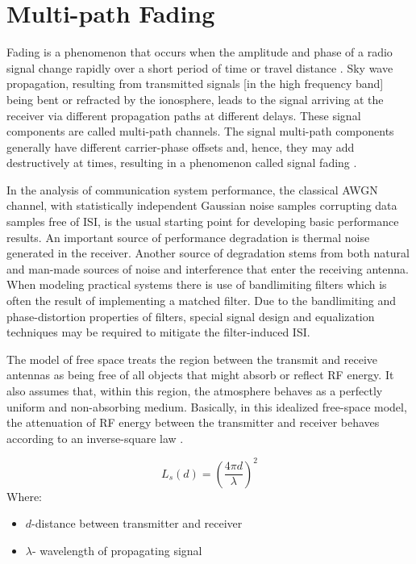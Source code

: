 \section{Multi-path Fading}
		
Fading is a phenomenon that occurs when the amplitude and phase of a radio signal change rapidly over a short period of time or travel distance \cite{fuqin}. Sky wave propagation, resulting from transmitted signals [in the high frequency band] being bent or refracted by the ionosphere, leads to the signal arriving at the receiver via different propagation paths at different delays.
These signal components are called multi-path channels. The signal multi-path components generally have different carrier-phase offsets and, hence, they may add destructively at times, resulting in a phenomenon called signal fading \cite{Proakis}.

In the analysis of communication system performance, the classical \gls{AWGN} channel, with statistically independent Gaussian noise samples corrupting data samples free of \gls{ISI}, is the usual starting point for developing basic performance results. An important source of performance degradation is thermal noise generated in the receiver. Another source of degradation stems from both natural and man-made sources of noise and interference that enter the receiving antenna. When modeling practical systems there is use of bandlimiting filters which is often the result of implementing a matched filter. Due to the bandlimiting and phase-distortion properties of filters, special signal design and equalization techniques may be required to mitigate the filter-induced \gls{ISI}.

The model of free space treats the region between the transmit and receive antennas as being free of all objects that might absorb or reflect \gls{RF} energy. It also assumes that, within this region, the atmosphere behaves as a perfectly uniform and non-absorbing medium. Basically, in this idealized free-space model, the attenuation of \gls{RF} energy between the transmitter and receiver behaves according to an inverse-square law \cite{AWGN}. 

$$L_{s}(d)= \left( \frac{4\pi d}{\lambda} \right)^2$$
Where:
 \begin{itemize}
	\item $d$-distance between transmitter and receiver
	\item $\lambda$- wavelength of propagating signal
	\end{itemize}
 
